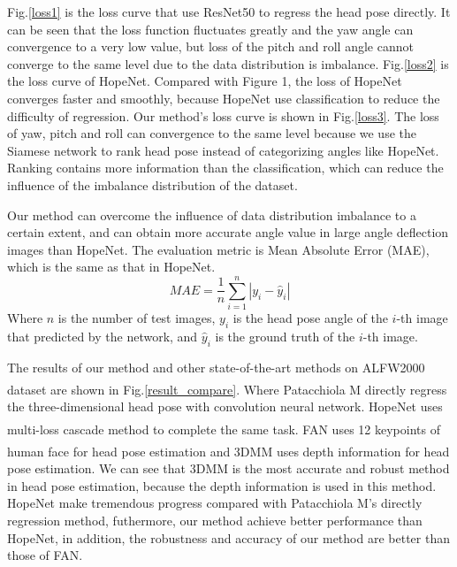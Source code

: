\documentclass[english]{DDCLSconf}
\newcommand{\upcite}[1]{\textsuperscript{\textsuperscript{\cite{#1}}}}%
\begin{document}

Fig.\ref{loss1} is the loss curve that use ResNet50 to regress the head pose directly. It can be seen that the loss function fluctuates greatly and the yaw angle can convergence to a very low value, but loss of the pitch and roll angle cannot converge to the same level due to the data distribution is imbalance. Fig.\ref{loss2} is the loss curve of HopeNet.
Compared with Figure 1, the loss of HopeNet converges faster and smoothly, because HopeNet use classification to reduce the difficulty of regression. Our method's loss curve is shown in Fig.\ref{loss3}. The loss of yaw, pitch and roll can convergence to the same level because we use the Siamese network to rank head pose instead of categorizing angles like HopeNet. Ranking contains more information than the classification, which can reduce the influence of the imbalance distribution of the dataset.

Our method can overcome the influence of data distribution imbalance to a certain extent, and can obtain more accurate angle value in large angle deflection images than HopeNet. The evaluation metric is Mean Absolute Error (MAE), which is the same as that in HopeNet. 
\begin{equation}
MAE = \frac{1}{n}\sum_{i=1}^{n}\left | y_i-\hat{y}_i \right |
\end{equation}
Where $n$ is the number of test images, $y_i$ is the head pose angle of the $i$-th image that predicted by the network, and $\hat{y}_i$ is the ground truth of the $i$-th image.

The results of our method and other state-of-the-art methods on ALFW2000 dataset are shown in Fig.\ref{result_compare}. Where Patacchiola M\upcite{direct_regression} directly regress the three-dimensional head pose with convolution neural network. HopeNet uses multi-loss cascade method to complete the same task. FAN\upcite{fan} uses 12 keypoints of human face for head pose estimation and 3DMM\upcite{3DMM} uses depth information for head pose estimation. We can see that 3DMM is the most accurate and robust method in head pose estimation, because the depth information is used in this method. HopeNet make tremendous progress compared with Patacchiola M's directly regression method, futhermore, our method achieve better performance than HopeNet, in addition, the robustness and accuracy of our method are better than those of FAN.
\end{document}
